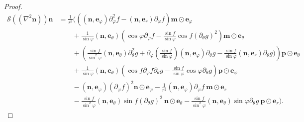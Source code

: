 \documentclass[10pt, a4paper]{article}
\newcommand\n{\mathbf{n}}
\newcommand\e{\mathbf{e}}
\newcommand\m{\mathbf{m}}
\newcommand\p{\mathbf{p}}
\newcommand\pp{\partial}
\begin{document}
\begin{proof}
\begin{equation}
\begin{aligned}
    \mathcal{S} ((\nabla^2 \n)) \n  & = \frac{1}{r^2} \Biggl( \left( (\n, \e_{\varphi}) \pp_{\varphi}^2 f - (\n, \e_r) \pp_{\varphi} f \right) \m \odot \e_{\varphi} \\
                                    & \qquad + \frac{1}{\sin \varphi} (\n, \e_{\theta}) \left(\cos \varphi \pp_{\varphi} f - \frac{\sin f}{\sin \varphi} \cos f (\pp_{\theta} g)^2 \right) \m \odot \e_{\theta} \\
    & \qquad + \left( \frac{\sin f}{\sin^2 \varphi} (\n, \e_{\theta}) \pp_{\theta}^2 g + \pp_{\varphi}(\frac{\sin f}{\sin \varphi}) (\n, \e_{\varphi}) \pp_{\theta} g - \frac{\sin f}{\sin \varphi} (\n, \e_r) \pp_{\theta} g ) \right) \p \odot \e _{\theta} \\
    & \qquad + \frac{1}{ \sin \varphi} (\n, \e_{\theta}) \left( \cos f \pp_{\varphi} f \pp_{\theta} g - \frac{\sin f}{\sin \varphi} \cos \varphi \pp_{\theta} g \right) \p \odot \e_{\varphi} \\
    & \qquad - (\n, \e_{\varphi}) (\pp_{\varphi} f)^2 \n \odot \e_{\varphi} - \frac{1}{r^2} (\n, \e_{\varphi}) \pp_{\varphi} f ~ \m \odot \e_r \\
    & \qquad - \frac{\sin f}{\sin^2 \varphi} (\n, \e_{\theta}) \sin f (\pp_{\theta}g)^2~ \n \odot \e_{\theta} - \frac{\sin f}{\sin^2 \varphi} (\n, \e_{\theta}) \sin \varphi \pp_{\theta} g ~ \p \odot \e_r \Biggr).
    \end{aligned}
\end{equation}


\end{proof}
\end{document}
